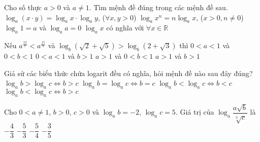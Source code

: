 \begin{ex}%
	Cho số thực $a>0$ và $a \neq 1$. Tìm mệnh đề đúng trong các mệnh đề sau.
	\choice
	{$\log _{a}(x \cdot y)=\log _{a} x \cdot \log _{a} y$, ($\forall x, y>0$)}
	{\True $\log_a x^n=n\log_a x$, ($x>0, n\neq 0$)}
	{$\log_a 1=a$ và $\log_a a=0$}
	{$\log_a x$ có nghĩa với $\forall x \in \mathbb{R}$}
\end{ex}
\begin{ex}%
	Nếu $a^{\frac{13}{7}}<a^{\frac{15}{8}}$ và $\log _{b} \left(\sqrt{2}+\sqrt{5}\right)>\log_{b} \left(2+\sqrt{3}\right)$ thì
	\choice
	{$0<a<1$ và $0<b<1$}
	{$0<a<1$ và $b>1$}
	{\True $a>1$ và $0<b<1$}
	{$a>1$ và $b>1$}
\end{ex}
\begin{ex}%
	Giả sử các biểu thức chứa logarit đều có nghĩa, hỏi mệnh đề nào sau đây đúng?
	\choice
	{$\log_a b > \log_a c \Leftrightarrow b > c$}
	{\True $\log_a b = \log_a c \Leftrightarrow b = c$}
	{$\log_a b < \log_a c \Leftrightarrow b < c$}
	{$\log_a b < \log_a c \Leftrightarrow b > c$}
\end{ex}
\begin{ex}%
	Cho $0 < a \neq 1$, $b > 0$, $c > 0$ và $\log_a b = -2$, $\log_a c = 5$. Giá trị của $\log_a \dfrac{a\sqrt{b}}{\sqrt[3]{c}}$ là
	\choice
	{$-\dfrac{4}{3}$}
	{$-\dfrac{5}{3}$}
	{$-\dfrac{5}{4}$}
	{\True $-\dfrac{3}{5}$}
\end{ex}
